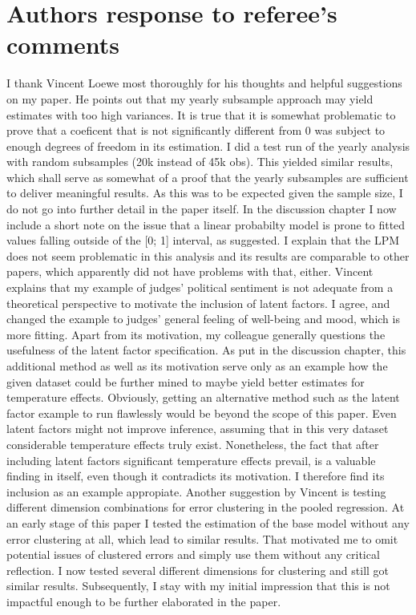 \documentclass[11pt]{article}
\begin{document}
	\section{Authors response to referee's comments}
			I thank Vincent Loewe most thoroughly for his thoughts and helpful suggestions on my paper. He points out that my yearly subsample approach may yield estimates with too high variances. It is true that it is somewhat problematic to prove that a coeficent that is not significantly different from 0 was subject to enough degrees of freedom in its estimation. I did a test run of the yearly analysis with random subsamples (20k instead of 45k obs). This yielded similar results, which shall serve as somewhat of a proof that the yearly subsamples are sufficient to deliver meaningful results. As this was to be expected given the sample size, I do not go into further detail in the paper itself.
			\newline In the discussion chapter I now include a short note on the issue that a linear probabilty model is prone to fitted values falling outside of the [0; 1] interval, as suggested. I explain that the LPM does not seem problematic in this analysis and its results are comparable to other papers, which apparently did not have problems with that, either.
			\newline Vincent explains that my example of judges' political sentiment is not adequate from a theoretical perspective to motivate the inclusion of latent factors. I agree, and changed the example to judges' general feeling of well-being and mood, which is more fitting. 
			Apart from its motivation, my colleague generally questions the usefulness of the latent factor specification. As put in the discussion chapter, this additional method as well as its motivation serve only as an example how the given dataset could be further mined to maybe yield better estimates for temperature effects. Obviously, getting an alternative method such as the latent factor example to run flawlessly would be beyond the scope of this paper. Even latent factors might not improve inference, assuming that in this very dataset considerable temperature effects truly exist. Nonetheless, the fact that after including latent factors significant temperature effects prevail, is a valuable finding in itself, even though it contradicts its motivation. I therefore find its inclusion as an example appropiate.
			\newline Another suggestion by Vincent is testing different dimension combinations for error clustering in the pooled regression. At an early stage of this paper I tested the estimation of the base model without any error clustering at all, which lead to similar results. That motivated me to omit potential issues of clustered errors and simply use them without any critical reflection. I now tested several different dimensions for clustering and still got similar results. Subsequently, I stay with my initial impression that this is not impactful enough to be further elaborated in the paper.
			
\end{document}
